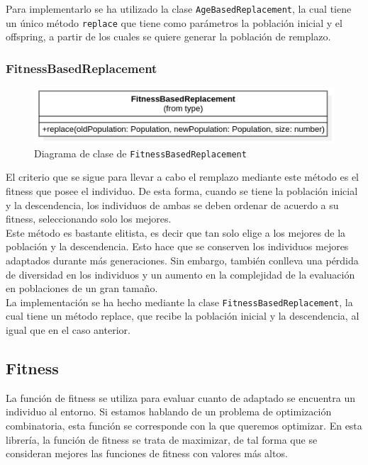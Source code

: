 Para implementarlo se ha utilizado la clase \texttt{AgeBasedReplacement}, la cual tiene un único método \texttt{replace} que tiene como parámetros la población inicial y el offspring, a partir de los cuales se quiere generar la población de remplazo.\\

\subsubsection{FitnessBasedReplacement}

\begin{figure}[ht]
    \centering
    \includegraphics[scale=0.5]{mem/images/cap-4/4.2.8(Reemplazo)/FitnessBasedReplacement.png}
    \caption{Diagrama de clase de \texttt{FitnessBasedReplacement}}
    \label{fig:my_label}
\end{figure}

El criterio que se sigue para llevar a cabo el remplazo mediante este método es el fitness que posee el individuo. De esta forma, cuando se tiene la población inicial y la descendencia, los individuos de ambas se deben ordenar de acuerdo a su fitness, seleccionando solo los mejores. \\

Este método es bastante elitista, es decir que tan solo elige a los mejores de la población y la descendencia. Esto hace que se conserven los individuos mejores adaptados durante más generaciones. Sin embargo, también conlleva una pérdida de diversidad en los individuos y un aumento en la complejidad de la evaluación en poblaciones de un gran tamaño. \\

La implementación se ha hecho mediante la clase \texttt{FitnessBasedReplacement}, la cual tiene un método replace, que recibe la población inicial y la descendencia, al igual que en el caso anterior.

\subsection{Fitness}

La función de fitness se utiliza para evaluar cuanto de adaptado se encuentra un individuo al entorno. Si estamos hablando de un problema de optimización combinatoria, esta función se corresponde con la que queremos optimizar. En esta librería, la función de fitness se trata de maximizar, de tal forma que se consideran mejores las funciones de fitness con valores más altos. \\

